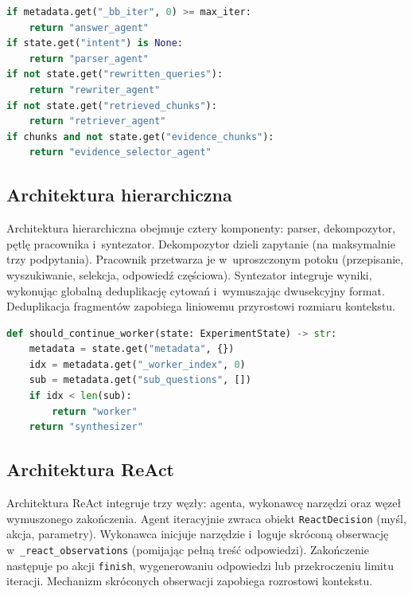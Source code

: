 \begin{lstlisting}[language=Python,
  caption={Reguły dyspozytora tablicowego},
  label={lst:reguly-dyspozytora-tablicowego}]
if metadata.get("_bb_iter", 0) >= max_iter:
    return "answer_agent"
if state.get("intent") is None:
    return "parser_agent"
if not state.get("rewritten_queries"):
    return "rewriter_agent"
if not state.get("retrieved_chunks"):
    return "retriever_agent"
if chunks and not state.get("evidence_chunks"):
    return "evidence_selector_agent"
\end{lstlisting}

\subsection{Architektura hierarchiczna}\label{subsec:architektura-hierarchiczna}

Architektura hierarchiczna obejmuje cztery komponenty: parser, dekompozytor,
pętlę pracownika i~syntezator. Dekompozytor dzieli zapytanie (na maksymalnie
trzy podpytania). Pracownik przetwarza je w~uproszczonym potoku (przepisanie,
wyszukiwanie, selekcja, odpowiedź częściowa). Syntezator integruje wyniki,
wykonując globalną deduplikację cytowań i~wymuszając dwusekcyjny format.
Deduplikacja fragmentów zapobiega liniowemu przyrostowi rozmiaru kontekstu.

\begin{lstlisting}[language=Python,
  caption={Pętla pracownika w~architekturze hierarchicznej},
  label={lst:petla-pracownika-w-architekturze-hierarchicznej}]
def should_continue_worker(state: ExperimentState) -> str:
    metadata = state.get("metadata", {})
    idx = metadata.get("_worker_index", 0)
    sub = metadata.get("sub_questions", [])
    if idx < len(sub):
        return "worker"
    return "synthesizer"
\end{lstlisting}

\subsection{Architektura ReAct}\label{subsec:architektura-react}

Architektura ReAct integruje trzy węzły: agenta, wykonawcę narzędzi oraz węzeł
wymuszonego zakończenia. Agent iteracyjnie zwraca obiekt \texttt{ReactDecision}
(myśl, akcja, parametry). Wykonawca inicjuje narzędzie i~loguje skróconą
obserwację w~\texttt{\_react\_observations} (pomijając pełną treść odpowiedzi).
Zakończenie następuje po akcji \texttt{finish}, wygenerowaniu odpowiedzi lub
przekroczeniu limitu iteracji. Mechanizm skróconych obserwacji zapobiega
rozrostowi kontekstu.

